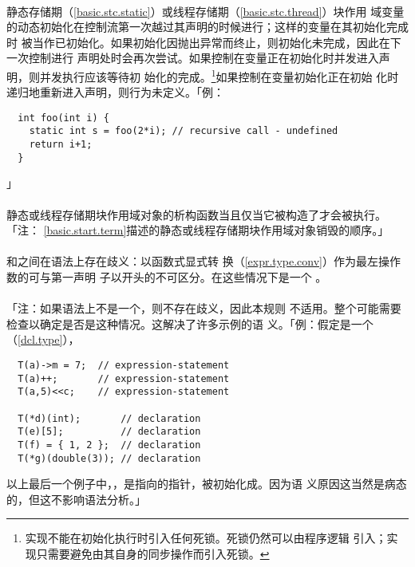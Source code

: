 \paragraph{}
静态存储期（\ref{basic.stc.static}）或线程存储期（\ref{basic.stc.thread}）块作用
域变量的动态初始化在控制流第一次越过其声明的时候进行；这样的变量在其初始化完成时
被当作已初始化。如果初始化因抛出异常而终止，则初始化未完成，因此在下一次控制进行
声明处时会再次尝试。如果控制在变量正在初始化时并发进入声明，则并发执行应该等待初
始化的完成。\footnote{实现不能在初始化执行时引入任何死锁。死锁仍然可以由程序逻辑
引入；实现只需要避免由其自身的同步操作而引入死锁。}如果控制在变量初始化正在初始
化时递归地重新进入声明，则行为未定义。「例：
\begin{lstlisting}
  int foo(int i) {
    static int s = foo(2*i); // recursive call - undefined
    return i+1;
  }
\end{lstlisting}」

\paragraph{}
静态或线程存储期块作用域对象的析构函数当且仅当它被构造了才会被执行。「注：
\ref{basic.start.term}描述的静态或线程存储期块作用域对象销毁的顺序。」

\paragraph{}
和之间在语法上存在歧义：以函数式显式转
换（\ref{expr.type.conv}）作为最左操作数的可与第一声明
子以\tm{(}开头的不可区分。在这些情况下是一个
。

\paragraph{}
「注：如果语法上不是一个，则不存在歧义，因此本规则
不适用。整个可能需要检查以确定是否是这种情况。这解决了许多示例的语
义。「例：假定是一个（\ref{dcl.type}），
\begin{lstlisting}
  T(a)->m = 7;  // expression-statement
  T(a)++;       // expression-statement
  T(a,5)<<c;    // expression-statement

  T(*d)(int);       // declaration
  T(e)[5];          // declaration
  T(f) = { 1, 2 };  // declaration
  T(*g)(double(3)); // declaration
\end{lstlisting}
以上最后一个例子中，，是指向的指针，被初始化成。因为语
义原因这当然是病态的，但这不影响语法分析。」

